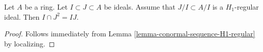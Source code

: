 \begin{lemma}
\label{lemma-conormal-sequence-H1-regular-ideal}
Let $A$ be a ring. Let $I \subset J \subset A$ be ideals.
Assume that $J/I \subset A/I$ is a $H_1$-regular ideal.
Then $I \cap J^2 = IJ$.
\end{lemma}

\begin{proof}
Follows immediately from Lemma \ref{lemma-conormal-sequence-H1-regular}
by localizing.
\end{proof}
